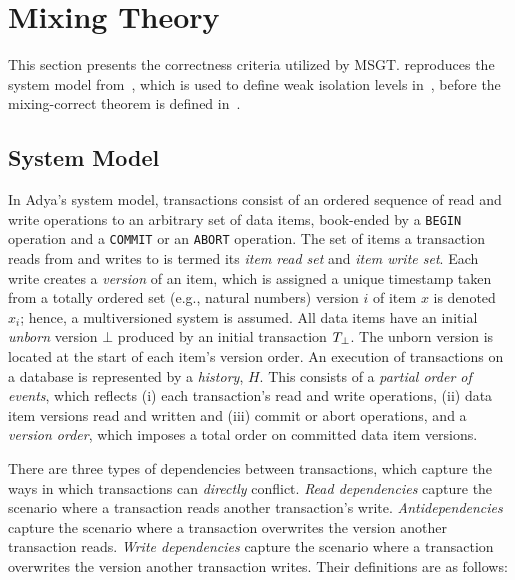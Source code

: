 \section{Mixing Theory}
\label{sec:mixing-theory}

This section presents the correctness criteria utilized by MSGT.  
reproduces the system model from~\cite{adya1999weak}, which is used to define weak isolation levels 
in~, before the mixing-correct theorem is defined in~.

\subsection{System Model}
\label{sec:system-model}

In Adya's system model, transactions consist of an ordered sequence of read and write operations to an 
arbitrary set of data items, book-ended by a \texttt{BEGIN} operation and a \texttt{COMMIT} or an 
\texttt{ABORT} operation. The set of items a transaction reads from and writes to is termed its 
\emph{item read set} and \emph{item write set}. Each write creates a \emph{version} of an item, which is 
assigned a unique timestamp taken from a totally ordered set (e.g., natural numbers) version $i$ of item $x$ is 
denoted $x_i$; hence, a multiversioned system is assumed. All data items have an initial \emph{unborn} version 
$\bot$ produced by an initial transaction $T_{\bot}$. The unborn version is located at the start of each 
item's version order. An execution of transactions on a database is represented by a \emph{history}, $H$. This 
consists of a \emph{partial order of events}, which reflects (i) each transaction's read and write operations, 
(ii) data item versions read and written and (iii) commit or abort operations, and a  \textit{version order}, 
which imposes a total order on committed data item versions.

There are three types of dependencies between transactions, which capture the ways in which transactions can 
\emph{directly} conflict. \emph{Read dependencies} capture the scenario where a transaction reads another 
transaction's write. \emph{Antidependencies} capture the scenario where a transaction overwrites the version 
another transaction reads. \emph{Write dependencies} capture the scenario where a transaction overwrites the 
version another transaction writes. Their definitions are as follows:

